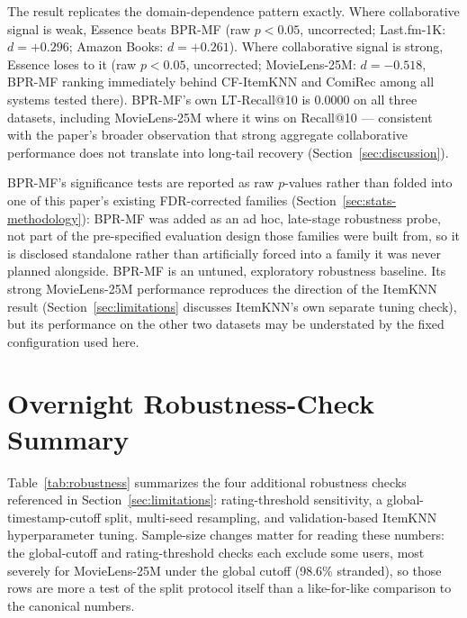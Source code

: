 \documentclass{article}
\begin{document}
The result replicates the domain-dependence pattern exactly. Where collaborative signal is weak, Essence beats BPR-MF (raw $p<0.05$, uncorrected; Last.fm-1K: $d=+0.296$; Amazon Books: $d=+0.261$). Where collaborative signal is strong, Essence loses to it (raw $p<0.05$, uncorrected; MovieLens-25M: $d=-0.518$, BPR-MF ranking immediately behind CF-ItemKNN and ComiRec among all systems tested there). BPR-MF's own LT-Recall@10 is $0.0000$ on all three datasets, including MovieLens-25M where it wins on Recall@10 --- consistent with the paper's broader observation that strong aggregate collaborative performance does not translate into long-tail recovery (Section~\ref{sec:discussion}).

BPR-MF's significance tests are reported as raw $p$-values rather than folded into one of this paper's existing FDR-corrected families (Section~\ref{sec:stats-methodology}): BPR-MF was added as an ad hoc, late-stage robustness probe, not part of the pre-specified evaluation design those families were built from, so it is disclosed standalone rather than artificially forced into a family it was never planned alongside. BPR-MF is an untuned, exploratory robustness baseline. Its strong MovieLens-25M performance reproduces the direction of the ItemKNN result (Section~\ref{sec:limitations} discusses ItemKNN's own separate tuning check), but its performance on the other two datasets may be understated by the fixed configuration used here.

\section{Overnight Robustness-Check Summary}
\label{app:robustness}

Table~\ref{tab:robustness} summarizes the four additional robustness checks referenced in Section~\ref{sec:limitations}: rating-threshold sensitivity, a global-timestamp-cutoff split, multi-seed resampling, and validation-based ItemKNN hyperparameter tuning. Sample-size changes matter for reading these numbers: the global-cutoff and rating-threshold checks each exclude some users, most severely for MovieLens-25M under the global cutoff (98.6\% stranded), so those rows are more a test of the split protocol itself than a like-for-like comparison to the canonical numbers.
\end{document}
